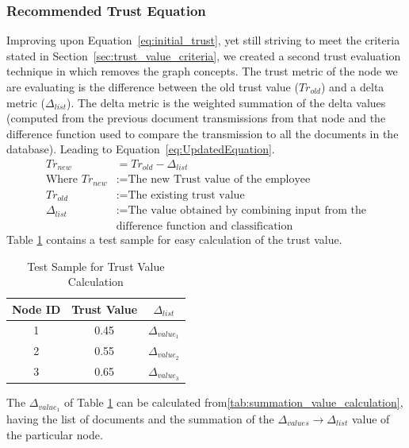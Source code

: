 \subsubsection{Recommended Trust Equation}
\label{sec:recommended_trust_equation}
Improving upon Equation~\ref{eq:initial_trust}, yet still striving to meet the
criteria stated in Section~\ref{sec:trust_value_criteria}, we created a second
trust evaluation technique in which removes the graph concepts. The trust metric
of the node we are evaluating is the difference between the old trust value
(\(Tr_{old}\)) and a delta metric (\(\Delta_{list}\)). The delta
metric is the weighted summation of the delta values (computed from the
previous document transmissions from that node and the difference function used to
compare the transmission to all the documents in the database).  Leading to
Equation~\ref{eq:UpdatedEquation}.
\begin{equation}
    \label{eq:UpdatedEquation}
    \begin{aligned}
        Tr_{new} &= Tr_{old} - \Delta_{list} \\
        \text{Where } Tr_{new} &:= \text{The new Trust value of the employee} \\
        Tr_{old} &:= \text{The existing trust value} \\
        \Delta_{list} &:= \text{The value obtained by combining input from the} \\
        &\text{difference function and classification}
    \end{aligned}
\end{equation}
Table \ref{tab:trust_value_calculation} contains a test sample for easy calculation of the trust value.

\begin{table}[h!]
    \centering
    \begin{tabular}{c | c | c}
        \hline 
        Node ID & Trust Value & \(\Delta_{list}\) \\
        \hline \hline
        1 & 0.45 & \(\Delta_{value_1}\) \\
        2 & 0.55 & \(\Delta_{value_2}\) \\
        3 & 0.65 & \(\Delta_{value_3}\) \\
    \end{tabular}
    \caption{Test Sample for Trust Value Calculation}
    \label{tab:trust_value_calculation}
\end{table}

The \(\Delta_{value_1}\) of Table
\ref{tab:trust_value_calculation} can be calculated
from\ref{tab:summation_value_calculation}, having the list of
documents and the summation of the \(\Delta_{values} \to \Delta_{list} \) value of the particular node. 

